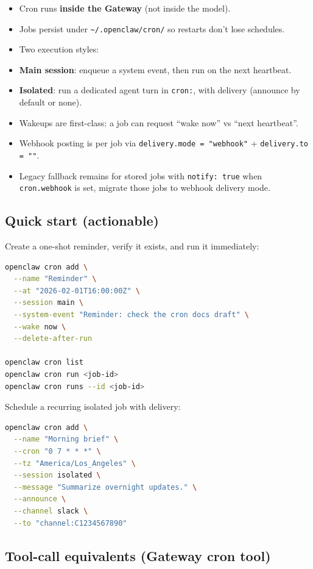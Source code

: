 \begin{itemize}
  \item Cron runs \textbf{inside the Gateway} (not inside the model).
  \item Jobs persist under \texttt{\textasciitilde{}/.openclaw/cron/} so restarts don’t lose schedules.
  \item Two execution styles:
  \item \textbf{Main session}: enqueue a system event, then run on the next heartbeat.
  \item \textbf{Isolated}: run a dedicated agent turn in \texttt{cron:}, with delivery (announce by default or none).
  \item Wakeups are first-class: a job can request “wake now” vs “next heartbeat”.
  \item Webhook posting is per job via \texttt{delivery.mode = "webhook"} + \texttt{delivery.to = ""}.
  \item Legacy fallback remains for stored jobs with \texttt{notify: true} when \texttt{cron.webhook} is set, migrate those jobs to webhook delivery mode.
\end{itemize}


\subsection{Quick start (actionable)}


Create a one-shot reminder, verify it exists, and run it immediately:

\begin{lstlisting}[language=bash]
openclaw cron add \
  --name "Reminder" \
  --at "2026-02-01T16:00:00Z" \
  --session main \
  --system-event "Reminder: check the cron docs draft" \
  --wake now \
  --delete-after-run

openclaw cron list
openclaw cron run <job-id>
openclaw cron runs --id <job-id>
\end{lstlisting}


Schedule a recurring isolated job with delivery:

\begin{lstlisting}[language=bash]
openclaw cron add \
  --name "Morning brief" \
  --cron "0 7 * * *" \
  --tz "America/Los_Angeles" \
  --session isolated \
  --message "Summarize overnight updates." \
  --announce \
  --channel slack \
  --to "channel:C1234567890"
\end{lstlisting}


\subsection{Tool-call equivalents (Gateway cron tool)}


